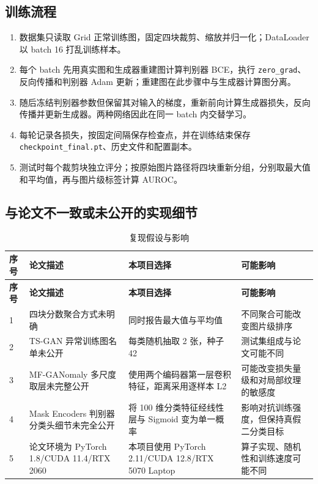 \documentclass[UTF8,12pt]{ctexart}
\begin{document}
\subsection{训练流程}

\begin{enumerate}
  \item 数据集只读取 Grid 正常训练图，固定四块裁剪、缩放并归一化；DataLoader 以 batch 16 打乱训练样本。
  \item 每个 batch 先用真实图和生成器重建图计算判别器 BCE，执行 \texttt{zero\_grad}、反向传播和判别器 Adam 更新；重建图在此步骤中与生成器计算图分离。
  \item 随后冻结判别器参数但保留其对输入的梯度，重新前向计算生成器损失，反向传播并更新生成器。两种网络因此在同一 batch 内交替学习。
  \item 每轮记录各损失，按固定间隔保存检查点，并在训练结束保存 \texttt{checkpoint\_final.pt}、历史文件和配置副本。
  \item 测试时每个裁剪块独立评分；按原始图片路径将四块重新分组，分别取最大值和平均值，再与图片级标签计算 AUROC。
\end{enumerate}

\subsection{与论文不一致或未公开的实现细节}

\begin{longtable}{C{1.1cm}L{3.7cm}L{4.4cm}L{4.0cm}}
\caption{复现假设与影响}\\
\toprule
\textbf{序号} & \textbf{论文描述} & \textbf{本项目选择} & \textbf{可能影响} \\
\midrule
\endfirsthead
\toprule
\textbf{序号} & \textbf{论文描述} & \textbf{本项目选择} & \textbf{可能影响} \\
\midrule
{} & 四块分数聚合方式未明确 & 同时报告最大值与平均值 & 不同聚合可能改变图片级排序 \\
2 & TS-GAN 异常训练图名单未公开 & 每类随机抽取 2 张，种子 42 & 测试集组成与论文可能不同 \\
3 & MF-GANomaly 多尺度取层未完整公开 & 使用两个编码器第一层卷积特征，距离采用逐样本 L2 & 可能改变损失量级和对局部纹理的敏感度 \\
4 & Mask Encoders 判别器分类头细节未完全公开 & 将 100 维分类特征经线性层与 Sigmoid 变为单一概率 & 影响对抗训练强度，但保持真假二分类目标 \\
5 & 论文环境为 PyTorch 1.8/CUDA 11.4/RTX 2060 & 本项目使用 PyTorch 2.11/CUDA 12.8/RTX 5070 Laptop & 算子实现、随机性和训练速度可能不同 \\
\bottomrule
\end{longtable}
\end{document}
